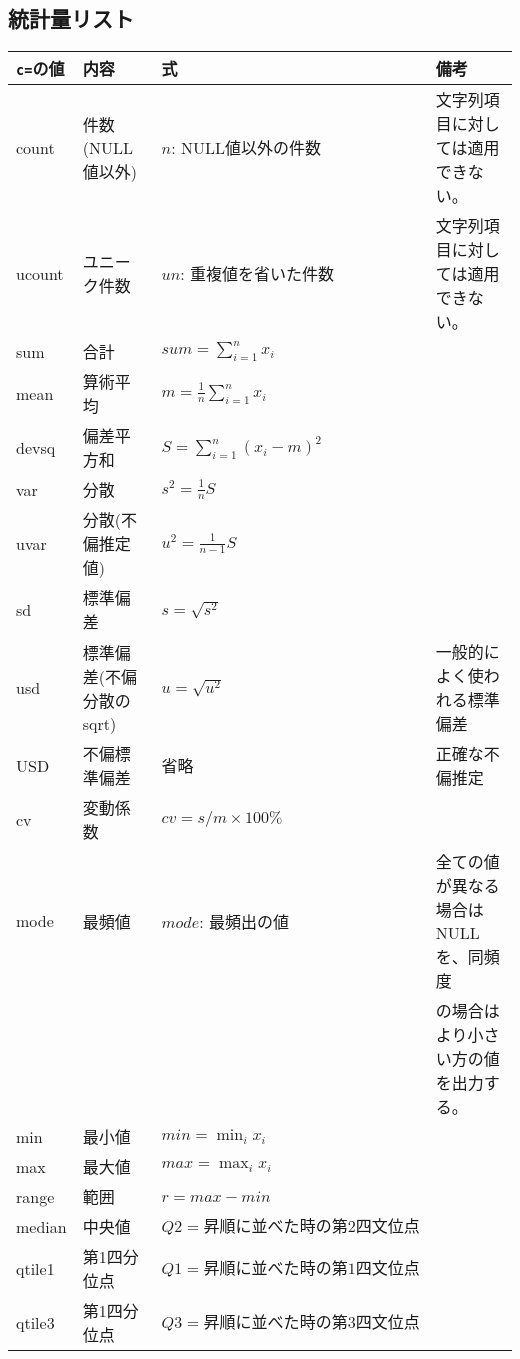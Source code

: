 \subsection*{統計量リスト}
\begin{table}[htbp]
{\small
\renewcommand{\arraystretch}{1.5}
\begin{tabular}{llll}
\hline
\verb|c=|の値 & 内容 & 式 & 備考 \\
\hline
count  & 件数(NULL値以外) & $n$: NULL値以外の件数 & 文字列項目に対しては適用できない。\\
ucount & ユニーク件数     & $un$: 重複値を省いた件数 &  文字列項目に対しては適用できない。\\
sum    & 合計             & $sum=\sum_{i=1}^n x_i$ & \\
mean   & 算術平均         & $m=\frac{1}{n}\sum_{i=1}^n x_i$ & \\
devsq  & 偏差平方和       & $S=\sum_{i=1}^n(x_i-m)^2$ & \\
var    & 分散             & $s^2=\frac{1}{n}S$ & \\
uvar   & 分散(不偏推定値) & $u^2=\frac{1}{n-1}S$ & \\
sd     & 標準偏差         & $s=\sqrt{s^2}$ & \\
usd    & 標準偏差(不偏分散のsqrt) & $u=\sqrt{u^2}$ & 一般的によく使われる標準偏差 \\
USD    & 不偏標準偏差     & 省略               & 正確な不偏推定 \\
cv     & 変動係数         & $cv=s/m×100\%$ & \\
mode   & 最頻値           & $mode$: 最頻出の値& 全ての値が異なる場合はNULLを、同頻度\\
       &                  &                   & の場合はより小さい方の値を出力する。\\
min    & 最小値           & $min=\min_i x_i$ & \\
max    & 最大値           & $max=\max_i x_i$ & \\
range  & 範囲             & $r=max-min$  & \\
median & 中央値           & $Q2=昇順に並べた時の第2四文位点$ & \\
qtile1 & 第1四分位点      & $Q1=昇順に並べた時の第1四文位点$ & \\
qtile3 & 第1四分位点      & $Q3=昇順に並べた時の第3四文位点$ & \\

\end{tabular}}
\end{table}
